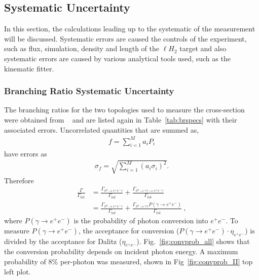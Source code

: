 \subsection{Systematic Uncertainty}\label{sec:results.systematics}

In this section, the calculations leading up to the systematic of the measurement will be discussed. Systematic errors are caused the controls of the experiment, such as flux, simulation, density and length of the $\ell H_2$ target and also systematic errors are caused by various analytical tools used, such as the kinematic fitter.
\subsubsection{Branching Ratio Systematic Uncertainty}
The branching ratios for the two topologies used to measure the cross-section were obtained from \label{abbr:pdg}~\cite{pdg} and are listed again in Table~\ref{tab:brspecs} with their associated errors. Uncorrelated quantities that are summed as,
\begin{align}
f = \sum_{i = 1}^{M}a_iP_i  
\end{align}
have errors as
\begin{align}
\sigma_f = \sqrt{\sum_{i = 1}^{M}\left(a_i\sigma_i\right)^2}.  
\end{align}
Therefore
\begin{align}
 \frac{\Gamma}{\Gamma_{tot}} &  = \frac{\Gamma_{\pi^{0}\rightarrow e^{+}e^{-}\gamma}}{\Gamma_{tot}} + \frac{\Gamma_{\pi^{0}\rightarrow \gamma \gamma \to e^{+}e^{-}\gamma}}{\Gamma_{tot}}  \\ & = \frac{\Gamma_{\pi^{0}\rightarrow e^{+}e^{-}\gamma}}{\Gamma_{tot}} + \frac{\Gamma_{\pi^{0}\rightarrow \gamma \gamma}P(\gamma \to  e^{+}e^{-})}{\Gamma_{tot}} \ ,
\end{align}
where $P(\gamma \to  e^{+}e^{-})$ is the probability of photon conversion into $e^+e^-$. To measure $P(\gamma \to  e^{+}e^{-})$, the acceptance for conversion ($P(\gamma \to  e^{+}e^{-})\cdot\eta_{e^+e^-}$) is divided by the acceptance for Dalitz ($\eta_{e^+e^-}$). Fig.~\ref{fig:convprob_all} shows that the conversion probability depends on incident photon energy. A maximum probability of 8\%  per-photon was measured, shown in Fig~\ref{fig:convprob_II} top left plot. 
